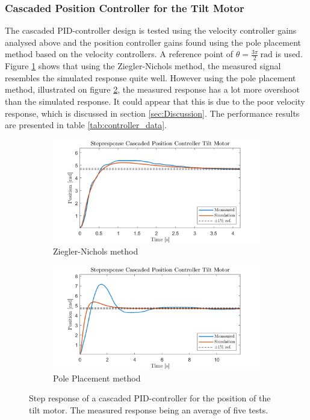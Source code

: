 \documentclass[../../main.tex]{subfiles}
\begin{document}
\subsubsection*{Cascaded Position Controller for the Tilt Motor}
The cascaded PID-controller design is tested using the velocity controller gains analysed above and the position controller gains found using the pole placement method based on the velocity controllers. A reference point of $\theta = \frac{3\pi}{2} \SI{}{\radian}$ is used. Figure \ref{fig:Cascade_ZN_tilt} shows that using the Ziegler-Nichols method, the measured signal resembles the simulated response quite well. However using the pole placement method, illustrated on figure \ref{fig:cascade_model_tilt}, the measured response has a lot more overshoot than the simulated response. It could appear that this is due to the poor velocity response, which is discussed in section \ref{sec:Discussion}. The performance results are presented in table \ref{tab:controller_data}.

\begin{figure}[h]
     \centering
     \begin{subfigure}[b]{0.49\textwidth}
         \centering
         \includegraphics[width=\textwidth]{Sections/Test/Images/cascade_ZN_tilt.png}
         \caption{Ziegler-Nichols method}
         \label{fig:Cascade_ZN_tilt}
     \end{subfigure}
     \hfill
     \begin{subfigure}[b]{0.49\textwidth}
         \centering
         \includegraphics[width=\textwidth]{Sections/Test/Images/cascade_Model_tilt.png}
         \caption{Pole Placement method}
         \label{fig:cascade_model_tilt}
     \end{subfigure}
        \caption{Step response of a cascaded PID-controller for the position of the tilt motor. The measured response being an average of five tests.}
        \label{fig:CascadeTilt}
\end{figure}
\end{document}
